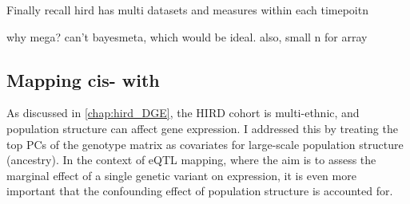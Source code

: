 %
%
%
%

Finally
recall hird has multi datasets and measures within each timepoitn

why mega?
    can't bayesmeta, which would be ideal.
    also, small n for array


\subsection{Mapping cis- with }

As discussed in \autoref{chap:hird_DGE}, the \gls{HIRD} cohort is multi-ethnic, and population structure can affect gene expression\autocite{brown2018ExpressionReflectsPopulation}.
I addressed this by treating the top \glspl{PC} of the genotype matrix as covariates for large-scale population structure (ancestry).
In the context of \gls{eQTL} mapping, where the aim is to assess the marginal effect of a single genetic variant on expression, it is even more important that the confounding effect of population structure is accounted for.

